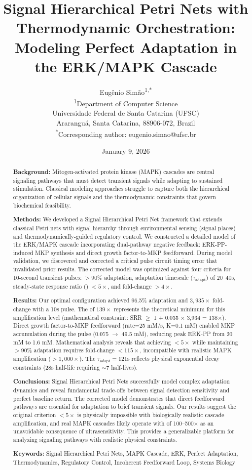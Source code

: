 \documentclass[twocolumn,11pt]{article}
\title{\textbf{Signal Hierarchical Petri Nets with Thermodynamic Orchestration: Modeling Perfect Adaptation in the ERK/MAPK Cascade}}
\author{
Eugênio Simão\textsuperscript{1,*}\\
\textsuperscript{1}Department of Computer Science\\
Universidade Federal de Santa Catarina (UFSC)\\
Araranguá, Santa Catarina, 88906-072, Brazil\\
\textsuperscript{*}Corresponding author: eugenio.simao@ufsc.br
}
\date{January 9, 2026}
\newcommand{\shpn}{Signal Hierarchical Petri Net}
\newcommand{\shpns}{Signal Hierarchical Petri Nets}
\newcommand{\erk}{ERK}
\newcommand{\mkp}{MKP}
\newcommand{\mapk}{MAPK}
\newcommand{\srr}{\text{SRR}}
\begin{document}
\maketitle

\begin{abstract}
\textbf{Background:} Mitogen-activated protein kinase (MAPK) cascades are central signaling pathways that must detect transient signals while adapting to sustained stimulation. Classical modeling approaches struggle to capture both the hierarchical organization of cellular signals and the thermodynamic constraints that govern biochemical feasibility.

\textbf{Methods:} We developed a \shpn{} framework that extends classical Petri nets with signal hierarchy through environmental sensing (signal places) and thermodynamically-guided regulatory control. We constructed a detailed model of the \erk{}/\mapk{} cascade incorporating dual-pathway negative feedback: ERK-PP-induced \mkp{} synthesis and direct growth factor-to-\mkp{} feedforward. During model validation, we discovered and corrected a critical pulse circuit timing error that invalidated prior results. The corrected model was optimized against four criteria for 10-second transient pulses: $>90\%$ adaptation, adaptation timescale ($\tau_{\text{adapt}}$) of 20--40s, steady-state response ratio (\srr{}) $<5\times$, and fold-change $>4\times$.

\textbf{Results:} Our optimal configuration achieved 96.5\% adaptation and $3{,}935\times$ fold-change with a 10s pulse. The \srr{} of $139\times$ represents the theoretical minimum for this amplification level (mathematical constraint: SRR $\geq$ 1 + 0.035 $\times$ 3,934 = 138$\times$). Direct growth factor-to-\mkp{} feedforward (rate=25 mM/s, K=0.1 mM) enabled \mkp{} accumulation during the pulse (0.075 $\to$ 49.5 mM), reducing peak \erk{}-PP from 20 mM to 1.6 mM. Mathematical analysis reveals that achieving \srr{} $<5\times$ while maintaining $>90\%$ adaptation requires fold-change $<115\times$, incompatible with realistic MAPK amplification ($>1{,}000\times$). The $\tau_{\text{adapt}}=121$s reflects physical exponential decay constraints (28s half-life requiring $\sim$7 half-lives).

\textbf{Conclusions:} \shpns{} successfully model complex adaptation dynamics and reveal fundamental trade-offs between signal detection sensitivity and perfect baseline return. The corrected model demonstrates that direct feedforward pathways are essential for adaptation to brief transient signals. Our results suggest the original criterion \srr{} $<5\times$ is physically impossible with biologically realistic cascade amplification, and real \mapk{} cascades likely operate with \srr{} of 100--500$\times$ as an unavoidable consequence of ultrasensitivity. This provides a generalizable platform for analyzing signaling pathways with realistic physical constraints.

\textbf{Keywords:} Signal Hierarchical Petri Nets, MAPK Cascade, ERK, Perfect Adaptation, Thermodynamics, Regulatory Control, Incoherent Feedforward Loop, Systems Biology
\end{abstract}
\end{document}
